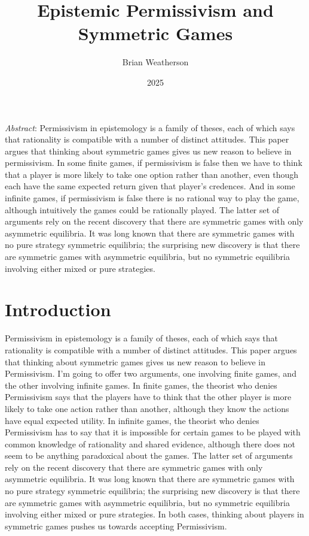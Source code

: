 \documentclass[
  11pt,
  letterpaper,
  DIV=11,
  numbers=noendperiod,
  twoside]{scrartcl}
\title{Epistemic Permissivism and Symmetric Games}
\author{Brian Weatherson}
\date{2025}
\renewenvironment{abstract}
 {\vspace{-1.25cm}
 \quotation\small\noindent\emph{Abstract}:}
 {\endquotation}
\begin{document}
\maketitle
\begin{abstract}
Permissivism in epistemology is a family of theses, each of which says
that rationality is compatible with a number of distinct attitudes. This
paper argues that thinking about symmetric games gives us new reason to
believe in permissivism. In some finite games, if permissivism is false
then we have to think that a player is more likely to take one option
rather than another, even though each have the same expected return
given that player's credences. And in some infinite games, if
permissivism is false there is no rational way to play the game,
although intuitively the games could be rationally played. The latter
set of arguments rely on the recent discovery that there are symmetric
games with only asymmetric equilibria. It was long known that there are
symmetric games with no pure strategy symmetric equilibria; the
surprising new discovery is that there are symmetric games with
asymmetric equilibria, but no symmetric equilibria involving either
mixed or pure strategies.
\end{abstract}


\section{Introduction}\label{introduction}

Permissivism in epistemology is a family of theses, each of which says
that rationality is compatible with a number of distinct attitudes. This
paper argues that thinking about symmetric games gives us new reason to
believe in Permissivism. I'm going to offer two arguments, one involving
finite games, and the other involving infinite games. In finite games,
the theorist who denies Permissivism says that the players have to think
that the other player is more likely to take one action rather than
another, although they know the actions have equal expected utility. In
infinite games, the theorist who denies Permissivism has to say that it
is impossible for certain games to be played with common knowledge of
rationality and shared evidence, although there does not seem to be
anything paradoxical about the games. The latter set of arguments rely
on the recent discovery that there are symmetric games with only
asymmetric equilibria. It was long known that there are symmetric games
with no pure strategy symmetric equilibria; the surprising new discovery
is that there are symmetric games with asymmetric equilibria, but no
symmetric equilibria involving either mixed or pure strategies. In both
cases, thinking about players in symmetric games pushes us towards
accepting Permissivism.
\end{document}
